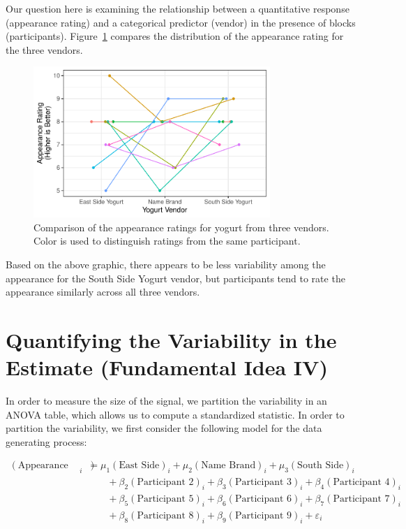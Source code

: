 \documentclass[
  letterpaper,
  DIV=11,
  numbers=noendperiod]{scrreprt}
\theoremstyle{plain}
\theoremstyle{definition}
\theoremstyle{definition}
\theoremstyle{remark}
\begin{document}
Our question here is examining the relationship between a quantitative
response (appearance rating) and a categorical predictor (vendor) in the
presence of blocks (participants). Figure~\ref{fig-blockrecap-plot}
compares the distribution of the appearance rating for the three
vendors.

\begin{figure}

{\centering \includegraphics[width=0.8\textwidth,height=\textheight]{./images/fig-blockrecap-plot-1.pdf}

}

\caption{\label{fig-blockrecap-plot}Comparison of the appearance ratings
for yogurt from three vendors. Color is used to distinguish ratings from
the same participant.}

\end{figure}

Based on the above graphic, there appears to be less variability among
the appearance for the South Side Yogurt vendor, but participants tend
to rate the appearance similarly across all three vendors.

\hypertarget{quantifying-the-variability-in-the-estimate-fundamental-idea-iv-2}{%
\section{Quantifying the Variability in the Estimate (Fundamental Idea
IV)}\label{quantifying-the-variability-in-the-estimate-fundamental-idea-iv-2}}

In order to measure the size of the signal, we partition the variability
in an ANOVA table, which allows us to compute a standardized statistic.
In order to partition the variability, we first consider the following
model for the data generating process:

\[
\begin{aligned}
  (\text{Appearance Rating})_i 
    &= \mu_1 (\text{East Side})_i + \mu_2 (\text{Name Brand})_i + \mu_3 (\text{South Side})_i \\
    &\qquad + \beta_2 (\text{Participant 2})_i + \beta_3 (\text{Participant 3})_i + \beta_4 (\text{Participant 4})_i \\
    &\qquad + \beta_5 (\text{Participant 5})_i + \beta_6 (\text{Participant 6})_i + \beta_7 (\text{Participant 7})_i \\
    &\qquad + \beta_8 (\text{Participant 8})_i + \beta_9 (\text{Participant 9})_i + \varepsilon_i
\end{aligned}
\]
\end{document}
